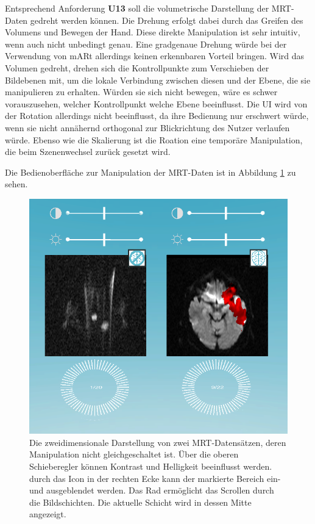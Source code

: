 Entsprechend Anforderung \textbf{U13} soll die volumetrische Darstellung der MRT-Daten gedreht werden können. 
Die Drehung erfolgt dabei durch das Greifen des Volumens und Bewegen der Hand. Diese direkte Manipulation ist sehr intuitiv, wenn auch nicht unbedingt genau. Eine gradgenaue Drehung würde bei der Verwendung von mARt allerdings keinen erkennbaren Vorteil bringen. 
Wird das Volumen gedreht, drehen sich die Kontrollpunkte zum Verschieben der Bildebenen mit, um die lokale Verbindung zwischen diesen und der Ebene, die sie manipulieren zu erhalten. Würden sie sich nicht bewegen, wäre es schwer vorauszusehen, welcher Kontrollpunkt welche Ebene beeinflusst. 
Die UI wird von der Rotation allerdings nicht beeinflusst, da ihre Bedienung nur erschwert würde, wenn sie nicht annähernd orthogonal zur Blickrichtung des Nutzer verlaufen würde. 
Ebenso wie die Skalierung ist die Roation eine temporäre Manipulation, die beim Szenenwechsel zurück gesetzt wird.


Die Bedienoberfläche zur Manipulation der MRT-Daten ist in Abbildung \ref{img:mARt2d} zu sehen.

\begin{figure}[!htb]
	\centering
	\includegraphics[width=0.5\linewidth]{images/mARt2d.png}
	\caption{Die zweidimensionale Darstellung von zwei MRT-Datensätzen, deren Manipulation nicht gleichgeschaltet ist. Über die oberen Schieberegler können Kontrast und Helligkeit beeinflusst werden. durch das Icon in der rechten Ecke kann der markierte Bereich ein- und ausgeblendet werden. Das Rad ermöglicht das Scrollen durch die Bildschichten. Die aktuelle Schicht wird in dessen Mitte angezeigt. }
	\label{img:mARt2d}
\end{figure}
\FloatBarrier

